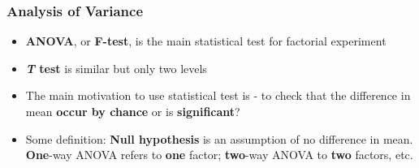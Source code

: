 \documentclass{beamer}
\begin{document}
%
%
\begin{frame}
	\frametitle{Analysis of Variance} 
	\begin{itemize}
		\item \textbf{ANOVA}, or \textbf{F-test}, is the main statistical test for factorial experiment
		\item \textbf{\textit{T} test} is similar but only two levels
		\item The main motivation to use statistical test is - to check that the difference in mean \textbf{occur by chance} or is \textbf{significant}?
		\item Some definition: \textbf{Null hypothesis} is an assumption of no difference in mean.  \textbf{One}-way ANOVA refers to \textbf{one} factor; \textbf{two}-way ANOVA to \textbf{two} factors, etc.%
	\end{itemize}
	
\end{frame}
\end{document}
